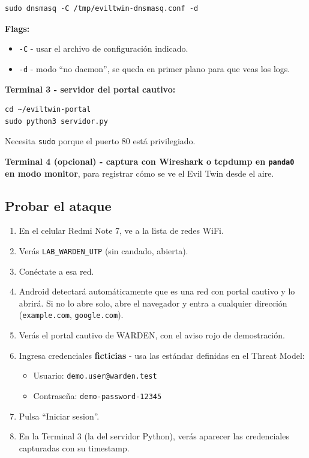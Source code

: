 \documentclass[11pt,a4paper]{article}
\begin{document}
\begin{lstlisting}
sudo dnsmasq -C /tmp/eviltwin-dnsmasq.conf -d
\end{lstlisting}

\textbf{Flags:}

\begin{itemize}
  \item \texttt{-C} - usar el archivo de configuración indicado.
  \item \texttt{-d} - modo ``no daemon'', se queda en primer plano para
    que veas los logs.
\end{itemize}

\textbf{Terminal 3 - servidor del portal cautivo:}

\begin{lstlisting}
cd ~/eviltwin-portal
sudo python3 servidor.py
\end{lstlisting}

Necesita \texttt{sudo} porque el puerto 80 está privilegiado.

\textbf{Terminal 4 (opcional) - captura con Wireshark o tcpdump en
\texttt{panda0} en modo monitor}, para registrar cómo se ve el Evil Twin
desde el aire.

\subsection{Probar el ataque}

\begin{enumerate}
  \item En el celular Redmi Note 7, ve a la lista de redes WiFi.
  \item Verás \texttt{LAB\_WARDEN\_UTP} (sin candado, abierta).
  \item Conéctate a esa red.
  \item Android detectará automáticamente que es una red con portal
    cautivo y lo abrirá. Si no lo abre solo, abre el navegador y entra
    a cualquier dirección (\texttt{example.com}, \texttt{google.com}).
  \item Verás el portal cautivo de WARDEN, con el aviso rojo de
    demostración.
  \item Ingresa credenciales \textbf{ficticias} - usa las estándar
    definidas en el Threat Model:
    \begin{itemize}
      \item Usuario: \texttt{demo.user@warden.test}
      \item Contraseña: \texttt{demo-password-12345}
    \end{itemize}
  \item Pulsa ``Iniciar sesion''.
  \item En la Terminal 3 (la del servidor Python), verás aparecer las
    credenciales capturadas con su timestamp.
\end{enumerate}
\end{document}
